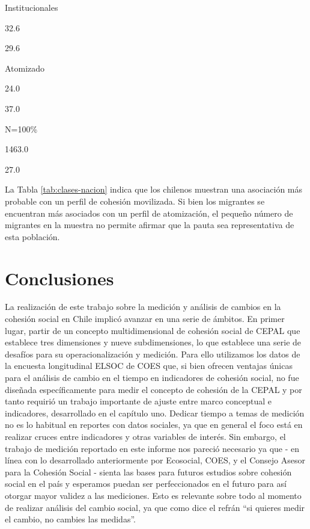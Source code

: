 \documentclass[
  12pt,
]{book}
\begin{document}
Institucionales

32.6

29.6

Atomizado

24.0

37.0

N=100\%

1463.0

27.0

La Tabla \ref{tab:clases-nacion} indica que los chilenos muestran una asociación más probable con un perfil de cohesión movilizada. Si bien los migrantes se encuentran más asociados con un perfil de atomización, el pequeño número de migrantes en la muestra no permite afirmar que la pauta sea representativa de esta población.

\hypertarget{conclusiones}{%
\chapter*{Conclusiones}\label{conclusiones}}

La realización de este trabajo sobre la medición y análisis de cambios en la cohesión social en Chile implicó avanzar en una serie de ámbitos. En primer lugar, partir de un concepto multidimensional de cohesión social de CEPAL que establece tres dimensiones y nueve subdimensiones, lo que establece una serie de desafíos para su operacionalización y medición. Para ello utilizamos los datos de la encuesta longitudinal ELSOC de COES que, si bien ofrecen ventajas únicas para el análisis de cambio en el tiempo en indicadores de cohesión social, no fue diseñada específicamente para medir el concepto de cohesión de la CEPAL y por tanto requirió un trabajo importante de ajuste entre marco conceptual e indicadores, desarrollado en el capítulo uno. Dedicar tiempo a temas de medición no es lo habitual en reportes con datos sociales, ya que en general el foco está en realizar cruces entre indicadores y otras variables de interés. Sin embargo, el trabajo de medición reportado en este informe nos pareció necesario ya que - en línea con lo desarrollado anteriormente por Ecosocial, COES, y el Consejo Asesor para la Cohesión Social - sienta las bases para futuros estudios sobre cohesión social en el país y esperamos puedan ser perfeccionados en el futuro para así otorgar mayor validez a las mediciones. Esto es relevante sobre todo al momento de realizar análisis del cambio social, ya que como dice el refrán ``si quieres medir el cambio, no cambies las medidas''.
\end{document}

